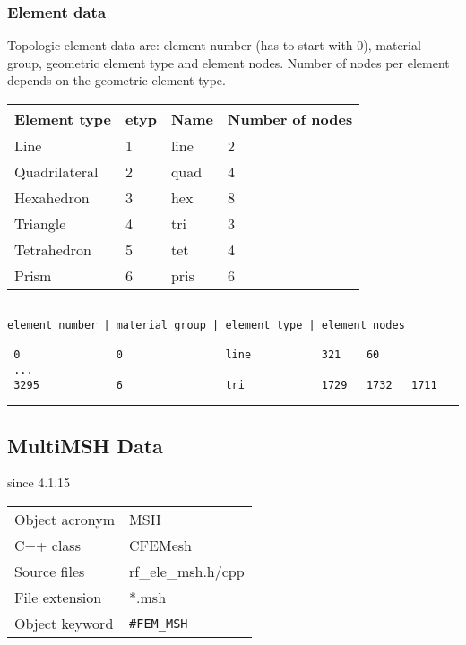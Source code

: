 \subsubsection{Element data}

Topologic element data are: element number (has to start with 0),
material group, geometric element type and element nodes. Number
of nodes per element depends on the geometric element type.

\begin{center}
\begin{tabular}{|ll|l|l|}
\hline
Element type  & etyp & Name & Number of nodes \\
\hline \hline
%
Line          & 1    & line & 2 \\
Quadrilateral & 2    & quad & 4 \\
Hexahedron    & 3    & hex  & 8 \\
Triangle      & 4    & tri  & 3 \\
Tetrahedron   & 5    & tet  & 4 \\
Prism         & 6    & pris & 6 \\
\hline
\end{tabular}
\end{center}


\small
\hrule
\begin{minipage}[t]{4cm}
\begin{verbatim}
element number | material group | element type | element nodes

 0               0                line           321    60
 ...
 3295            6                tri            1729   1732   1711

\end{verbatim}
\end{minipage}
\hrule \normalsize


\newpage
\subsection{MultiMSH Data}
\label{sec:msh}

since 4.1.15

\begin{tabular*}{5.85cm}{|p{2.5cm}|p{2.5cm}|} \hline
Object acronym & MSH \\
C++ class  & CFEMesh \\
Source files   & rf\_ele\_msh.h/cpp \\
\hline
File extension & *.msh\\
Object keyword &  {\texttt{\#FEM\_MSH}} \\
\hline
\end{tabular*}

